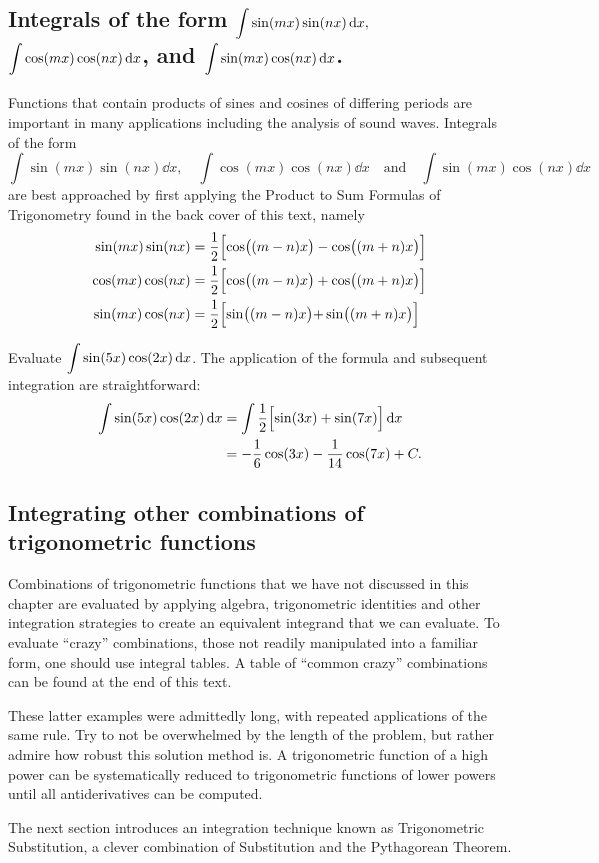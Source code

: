 \subsection{Integrals of the form \texorpdfstring{$\displaystyle \int\sin(mx)\sin(nx)\operatorname{d}\! x,$ $\displaystyle\int \cos(mx)\cos(nx)\operatorname{d}\! x$, and $\displaystyle\int \sin(mx)\cos(nx)\operatorname{d}\! x$.}{∫sin(mx)sin(nx)dx, ∫cos(mx)cos(nx)dx, and ∫sin(mx)cos(nx)dx}}

Functions that contain products of sines and cosines of differing periods are important in many applications including the analysis of sound waves. Integrals of the form 
\[
\int\sin(mx)\sin(nx)\dd x,\quad \int \cos(mx)\cos(nx)\dd x \quad \text{and}\quad\int \sin(mx)\cos(nx)\dd x
\]
are best approached by first applying the Product to Sum Formulas of Trigonometry found in the back cover of this text, namely
\begin{align*}
\sin(mx)\sin(nx) &= \frac12\Bigl[\cos\bigl((m-n)x\bigr)-\cos\bigl((m+n)x\bigr)\Bigr] \\
\cos(mx)\cos(nx) &= \frac12\Bigl[\cos\bigl((m-n)x\bigr)+\cos\bigl((m+n)x\bigr)\Bigr] \\
\sin(mx)\cos(nx) &=	\frac12\Bigl[\sin\bigl((m-n)x\bigl)+\sin\bigl((m+n)x\bigr)\Bigr]
\end{align*}

\begin{example}\label{ex_trigint4}%
Evaluate $\displaystyle\int\sin(5x)\cos(2x)\operatorname{d}\! x$.
\solution
The application of the formula and subsequent integration are straightforward:
\begin{align*}
	\int\sin(5x)\cos(2x)\operatorname{d}\! x
	&= \int \frac12\Bigl[\sin(3x)+\sin(7x)\Bigr]\operatorname{d}\! x \\
	&= -\frac16\cos(3x) - \frac1{14}\cos(7x) + C.
\end{align*}
\end{example}

\subsection{Integrating other combinations of trigonometric functions}

Combinations of trigonometric functions that we have not discussed in this chapter are evaluated by applying algebra, trigonometric identities and other integration strategies to create an equivalent integrand that we can evaluate. To evaluate ``crazy'' combinations, those not readily manipulated into a familiar form, one should use integral tables. A table of ``common crazy'' combinations can be found at the end of this text.

These latter examples were admittedly long, with repeated applications of the same rule. Try to not be overwhelmed by the length of the problem, but rather admire how robust this solution method is. A trigonometric function of a high power can be systematically reduced to trigonometric functions of lower powers until all antiderivatives can be computed. 

The next section introduces an integration technique known as Trigonometric Substitution, a clever combination of Substitution and the Pythagorean Theorem.

